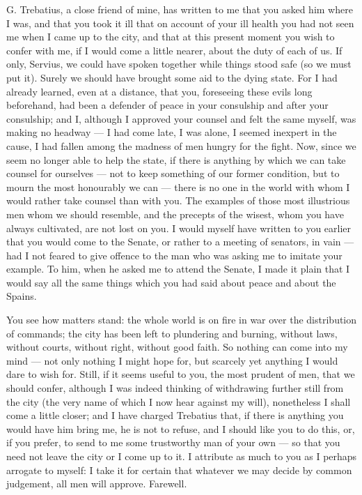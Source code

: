 

 G. Trebatius, a close friend of mine, has written to me that you asked him where I was, and that you took it ill that on account of your ill health you had not seen me when I came up to the city, and that at this present moment you wish to confer with me, if I would come a little nearer, about the duty of each of us. If only, Servius, we could have spoken together while things stood safe (so we must put it). Surely we should have brought some aid to the dying state. For I had already learned, even at a distance, that you, foreseeing these evils long beforehand, had been a defender of peace in your consulship and after your consulship; and I, although I approved your counsel and felt the same myself, was making no headway --- I had come late, I was alone, I seemed inexpert in the cause, I had fallen among the madness of men hungry for the fight. Now, since we seem no longer able to help the state, if there is anything by which we can take counsel for ourselves --- not to keep something of our former condition, but to mourn the most honourably we can --- there is no one in the world with whom I would rather take counsel than with you. The examples of those most illustrious men whom we should resemble, and the precepts of the wisest, whom you have always cultivated, are not lost on you. I would myself have written to you earlier that you would come to the Senate, or rather to a meeting of senators, in vain --- had I not feared to give offence to the man who was asking me to imitate your example. To him, when he asked me to attend the Senate, I made it plain that I would say all the same things which you had said about peace and about the Spains.

 You see how matters stand: the whole world is on fire in war over the distribution of commands; the city has been left to plundering and burning, without laws, without courts, without right, without good faith. So nothing can come into my mind --- not only nothing I might hope for, but scarcely yet anything I would dare to wish for. Still, if it seems useful to you, the most prudent of men, that we should confer, although I was indeed thinking of withdrawing further still from the city (the very name of which I now hear against my will), nonetheless I shall come a little closer; and I have charged Trebatius that, if there is anything you would have him bring me, he is not to refuse, and I should like you to do this, or, if you prefer, to send to me some trustworthy man of your own --- so that you need not leave the city or I come up to it. I attribute as much to you as I perhaps arrogate to myself: I take it for certain that whatever we may decide by common judgement, all men will approve. Farewell.
